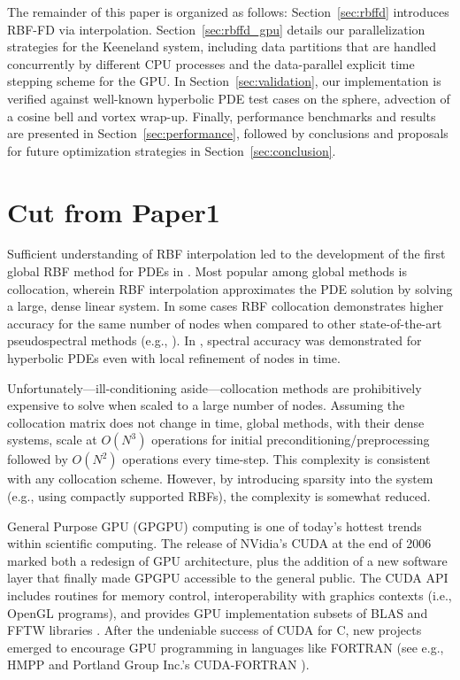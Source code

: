 The remainder of this paper is organized as follows: Section~\ref{sec:rbffd} introduces RBF-FD via interpolation. Section~\ref{sec:rbffd_gpu} details our parallelization strategies for the Keeneland system, including data partitions that are handled concurrently by different CPU processes and the data-parallel explicit time stepping scheme for the GPU. In Section~\ref{sec:validation}, our implementation is verified against well-known hyperbolic PDE test cases on the sphere, advection of a cosine bell and vortex wrap-up. Finally, performance benchmarks and results are presented in Section~\ref{sec:performance}, followed by conclusions and proposals for future optimization strategies in Section~\ref{sec:conclusion}.

\section{Cut from Paper1}



Sufficient understanding of RBF interpolation led to the development of the first global RBF method for PDEs in \cite{Kansa1990a}. Most popular among global methods is collocation, wherein RBF interpolation approximates the PDE solution by solving a large, dense linear system. 
In some cases RBF collocation demonstrates higher accuracy for the same number of nodes when compared to other state-of-the-art pseudospectral methods (e.g., \cite{Larsson2003} \cite{Flyer2007} \cite{Flyer2009b}). In \cite{Flyer2010}, spectral accuracy was demonstrated for hyperbolic PDEs even with local refinement of nodes in time.


Unfortunately---ill-conditioning aside---collocation methods are prohibitively expensive to solve when scaled to a large number of nodes. Assuming the collocation matrix does not change in time, global methods, with their dense systems, scale at $O(N^3)$ operations for initial preconditioning/preprocessing followed by $O(N^2)$ operations every time-step. This complexity is consistent with any collocation scheme. However, by introducing sparsity into the system (e.g., using compactly supported RBFs), the complexity is somewhat reduced.



General Purpose GPU (GPGPU) computing is one of today's hottest trends within scientific computing. 
The release of NVidia's CUDA at the end of 2006 marked both a 
redesign of GPU architecture, plus the addition of a new software layer that finally made GPGPU accessible to the general public. The CUDA API includes routines for memory control, interoperability with graphics contexts (i.e., 
OpenGL programs), and provides GPU implementation subsets of BLAS and FFTW libraries \cite{CudaGuide2011}. After the undeniable success of CUDA for C, new projects emerged to encourage GPU programming in languages like FORTRAN (see e.g., HMPP \cite{HMPP2009} and Portland Group Inc.'s CUDA-FORTRAN \cite{CudaFortran2009}). 

